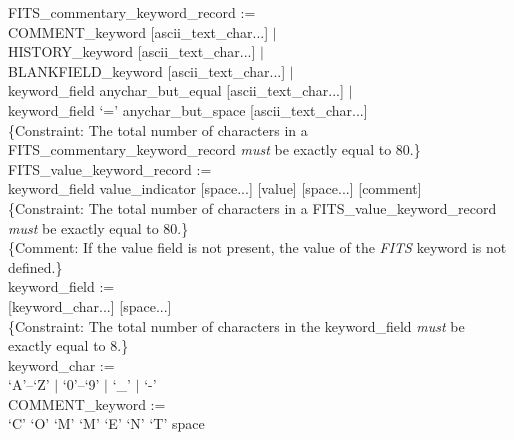 \documentclass[11pt,makeidx]{book}     %
\begin{document}
FITS\_commentary\_keyword\_record := \\ \null \hspace{0.5in}
	COMMENT\_keyword [ascii\_text\_char...]    $|$ \\ \null \hspace{0.5in}
	HISTORY\_keyword [ascii\_text\_char...]    $|$ \\ \null \hspace{0.5in}
	BLANKFIELD\_keyword [ascii\_text\_char...] $|$ \\ \null \hspace{0.5in}
	keyword\_field anychar\_but\_equal [ascii\_text\_char...] $|$ \\ \null \hspace{0.5in}
	keyword\_field `=' anychar\_but\_space [ascii\_text\_char...] \\
\{Constraint: The total number of characters in a
FITS\_commentary\_keyword\_record {\em must} be exactly equal to 80.\} \\


FITS\_value\_keyword\_record :=  \\ \null \hspace{0.5in}
	keyword\_field value\_indicator [space...] [value] [space...] [comment]  \\
\{Constraint: The total number of characters in a FITS\_value\_keyword\_record 
{\em must} be exactly equal to 80.\} \\
\{Comment: If the value field is not present, the value of the 
{\em FITS\/} keyword is not defined.\} \\

keyword\_field :=  \\ \null \hspace{0.5in}
	[keyword\_char...] [space...] \\
\{Constraint: The total number of characters in the keyword\_field {\em must} 
be exactly equal to 8.\} \\

keyword\_char :=  \\ \null \hspace{0.5in}
	`A'--`Z' $|$ `0'--`9' $|$ `\_' $|$ `-' \\

COMMENT\_keyword :=  \\ \null \hspace{0.5in}
	`C' `O' `M' `M' `E' `N' `T' space \\
\end{document}
